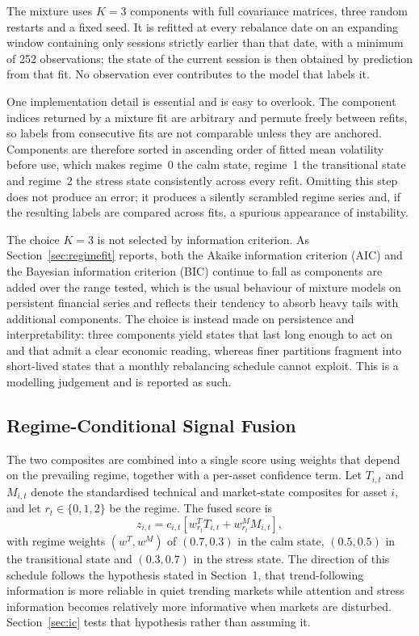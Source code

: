 \documentclass{singlecol-new}
\theoremstyle{TH}{
\newtheorem{lemma}{Lemma}
\newtheorem{theorem}[lemma]{Theorem}
\newtheorem{corrolary}[lemma]{Corrolary}
\newtheorem{conjecture}[lemma]{Conjecture}
\newtheorem{proposition}[lemma]{Proposition}
\newtheorem{claim}[lemma]{Claim}
\newtheorem{stheorem}[lemma]{Wrong Theorem}
\newtheorem{algorithm}{Algorithm}
}
\theoremstyle{THrm}{
\newtheorem{definition}{Definition}[section]
\newtheorem{question}{Question}[section]
\newtheorem{remark}{Remark}
\newtheorem{scheme}{Scheme}
}
\theoremstyle{THhit}{
\newtheorem{case}{Case}[section]
}
\begin{document}
The mixture uses $K = 3$ components with full covariance matrices, three random
restarts and a fixed seed. It is refitted at every rebalance date on an expanding
window containing only sessions strictly earlier than that date, with a minimum of 252
observations; the state of the current session is then obtained by prediction from that
fit. No observation ever contributes to the model that labels it.

One implementation detail is essential and is easy to overlook. The component indices
returned by a mixture fit are arbitrary and permute freely between refits, so labels
from consecutive fits are not comparable unless they are anchored. Components are
therefore sorted in ascending order of fitted mean volatility before use, which makes
regime~0 the calm state, regime~1 the transitional state and regime~2 the stress state
consistently across every refit. Omitting this step does not produce an error; it
produces a silently scrambled regime series and, if the resulting labels are compared
across fits, a spurious appearance of instability.

The choice $K = 3$ is not selected by information criterion. As
Section~\ref{sec:regimefit} reports, both the Akaike information criterion (AIC)
and the Bayesian information criterion (BIC) continue to fall as components are added
over the range tested, which is the usual behaviour of mixture models on
persistent financial series and reflects their tendency to absorb heavy tails with
additional components. The choice is instead made on persistence and interpretability:
three components yield states that last long enough to act on and that admit a clear
economic reading, whereas finer partitions fragment into short-lived states that a
monthly rebalancing schedule cannot exploit. This is a modelling judgement and is
reported as such.

\subsection{Regime-Conditional Signal Fusion}

The two composites are combined into a single score using weights that depend on the
prevailing regime, together with a per-asset confidence term. Let $T_{i,t}$ and
$M_{i,t}$ denote the standardised technical and market-state composites for asset $i$,
and let $r_t \in \{0,1,2\}$ be the regime. The fused score is
\begin{equation}
z_{i,t} = c_{i,t} \left[ w^{T}_{r_t} T_{i,t} + w^{M}_{r_t} M_{i,t} \right],
\end{equation}
with regime weights $(w^T, w^M)$ of $(0.7, 0.3)$ in the calm state, $(0.5, 0.5)$ in the
transitional state and $(0.3, 0.7)$ in the stress state. The direction of this schedule
follows the hypothesis stated in Section~1, that trend-following information is more
reliable in quiet trending markets while attention and stress information becomes
relatively more informative when markets are disturbed. Section~\ref{sec:ic} tests that
hypothesis rather than assuming it.
\end{document}
